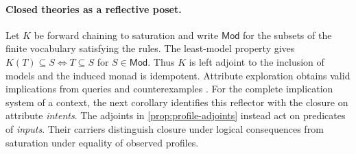 \documentclass[11pt,a4paper]{article}
\theoremstyle{definition}
\theoremstyle{remark}\newaliascnt{remark}{theorem}
\numberwithin{equation}{section}
\begin{document}
\paragraph{Closed theories as a reflective poset.}
Let \(K\) be forward chaining to saturation and write \(\mathsf{Mod}\) for the subsets of the finite vocabulary satisfying the rules. The least-model property gives \(K(T)\subseteq S\Longleftrightarrow T\subseteq S\) for \(S\in\mathsf{Mod}\). Thus \(K\) is left adjoint to the inclusion of models and the induced monad is idempotent. Attribute exploration obtains valid implications from queries and counterexamples \cite{ganter-exploration}. For the complete implication system of a context, the next corollary identifies this reflector with the closure on attribute \emph{intents}. The adjoints in \cref{prop:profile-adjoints} instead act on predicates of \emph{inputs}. Their carriers distinguish closure under logical consequences from saturation under equality of observed profiles.
\end{document}
